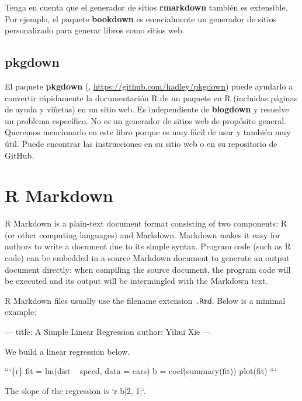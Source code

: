 \documentclass[12pt,]{krantz}
\makeatletter
\newenvironment{Shaded}{\begin{snugshade}}{\end{snugshade}}
\newcommand{\BaseNTok}[1]{\textcolor[rgb]{0.00,0.00,0.81}{#1}}
\newcommand{\NormalTok}[1]{#1}
\newenvironment{kframe}{%
\medskip{}
\setlength{\fboxsep}{.8em}
 \def\at@end@of@kframe{}%
 \ifinner\ifhmode%
  \def\at@end@of@kframe{\end{minipage}}%
  \begin{minipage}{\columnwidth}%
 \fi\fi%
 \def\FrameCommand##1{\hskip\@totalleftmargin \hskip-\fboxsep
 \colorbox{shadecolor}{##1}\hskip-\fboxsep
     \hskip-\linewidth \hskip-\@totalleftmargin \hskip\columnwidth}%
 \MakeFramed {\advance\hsize-\width
   \@totalleftmargin\z@ \linewidth\hsize
   \@setminipage}}%
 {\par\unskip\endMakeFramed%
 \at@end@of@kframe}
\renewenvironment{Shaded}{\begin{kframe}}{\end{kframe}}
\theoremstyle{definition}
\theoremstyle{definition}
\theoremstyle{definition}
\theoremstyle{remark}
\makeatother
\begin{document}
Tenga en cuenta que el generador de sitios \textbf{rmarkdown} también es
extensible. Por ejemplo, el paquete \textbf{bookdown} \citep{R-bookdown}
es esencialmente un generador de sitios personalizado para generar
libros como sitios web.

\hypertarget{pkgdown}{%
\section{pkgdown}\label{pkgdown}}

El paquete \textbf{pkgdown} (\citet{R-pkgdown},
\url{https://github.com/hadley/pkgdown}) puede ayudarlo a convertir
rápidamente la documentación R de un paquete en R (incluidas páginas de
ayuda y viñetas) en un sitio web. Es independiente de \textbf{blogdown}
y resuelve un problema específico. No es un generador de sitios web de
propósito general. Queremos mencionarlo en este libro porque es muy
fácil de usar y también muy útil. Puede encontrar las instrucciones en
su sitio web o en su repositorio de GitHub.

\cleardoublepage

\hypertarget{appendix-appendix}{%
\appendix {}}


\hypertarget{r-markdown}{%
\chapter{R Markdown}\label{r-markdown}}

R Markdown \citep{R-rmarkdown} is a plain-text
document format consisting of two components: R (or other computing
languages) and Markdown. Markdown makes it easy for authors to write a
document due to its simple syntax. Program code (such as R code) can be
embedded in a source Markdown document to generate an output document
directly: when compiling the source document, the program code will be
executed and its output will be intermingled with the Markdown text.

R Markdown files usually use the filename extension \texttt{.Rmd}. Below
is a minimal example:

\begin{Shaded}
\begin{Highlighting}[]
\NormalTok{---}
\NormalTok{title: A Simple Linear Regression}
\NormalTok{author: Yihui Xie}
\NormalTok{---}

\NormalTok{We build a linear regression below.}

\NormalTok{```\{r\}}
\NormalTok{fit = lm(dist ~ speed, data = cars)}
\NormalTok{b = coef(summary(fit))}
\NormalTok{plot(fit)}
\NormalTok{```}

\NormalTok{The slope of the regression is }\BaseNTok{`r b[2, 1]`}\NormalTok{.}
\end{Highlighting}
\end{Shaded}
\end{document}
